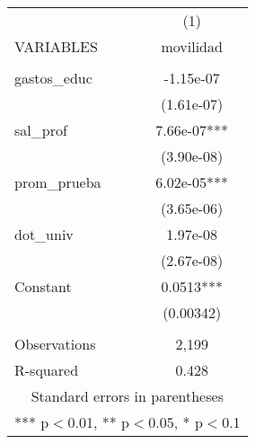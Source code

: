 \documentclass[]{article}
\begin{document}
\begin{tabular}{lc} \hline
 & (1) \\
VARIABLES & movilidad \\ \hline
 &  \\
gastos\_educ & -1.15e-07 \\
 & (1.61e-07) \\
sal\_prof & 7.66e-07*** \\
 & (3.90e-08) \\
prom\_prueba & 6.02e-05*** \\
 & (3.65e-06) \\
dot\_univ & 1.97e-08 \\
 & (2.67e-08) \\
Constant & 0.0513*** \\
 & (0.00342) \\
 &  \\
Observations & 2,199 \\
 R-squared & 0.428 \\ \hline
\multicolumn{2}{c}{ Standard errors in parentheses} \\
\multicolumn{2}{c}{ *** p$<$0.01, ** p$<$0.05, * p$<$0.1} \\
\end{tabular}
\end{document}

